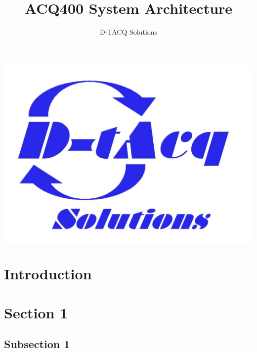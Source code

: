 \documentclass[]{article}
\title{ACQ400 System Architecture}
\author{D-TACQ Solutions}
\begin{document}
\maketitle
\thispagestyle{empty} %
\begin{center}
\includegraphics{images/dtacq_logo_new}
\end{center}

\begin{abstract}
\lipsum[1-2]
\end{abstract}

\begin{versionhistory}
\end{versionhistory}
\setcounter{table}{0} %

\pagebreak

\tableofcontents

\section{Introduction}
\lipsum[1-3]

\section{Section 1}
\lipsum[1-2]
\subsection{Subsection 1}
\lipsum[1-2]
\end{document}
